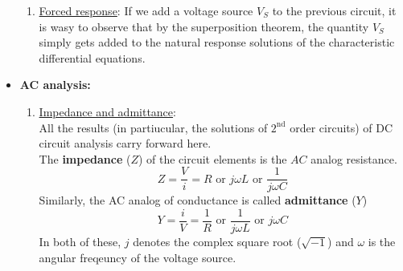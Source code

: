 \documentclass[a4paper]{article}
\begin{document}
\begin{itemize}
\begin{enumerate}
    \item \underline{Forced response}: If we add a voltage source $V_S$ to the previous circuit, it is wasy to observe that by the superposition theorem, the quantity $V_S$ simply gets added to the natural response solutions of the characteristic differential equations.
    \end{enumerate}
    
  \item \textbf{AC analysis:}\\
    \begin{enumerate}
    \item \underline{Impedance and admittance}:\\
      All the results (in partiucular, the solutions of $2^{\text{nd}}$ order circuits) of DC circuit analysis carry forward here.\\
      The \textbf{impedance} ($Z$) of the circuit elements is the $AC$ analog resistance.
      \begin{equation*}
        Z = \frac{V}{i} = R \text{ or } j\omega L  \text{ or } \frac{1}{j\omega C}
      \end{equation*}
      Similarly, the AC analog of conductance is called \textbf{admittance} ($Y$)
      \begin{equation*}
        Y = \frac{i}{V} = \frac{1}{R} \text{ or } \frac{1}{j\omega L} \text{ or }j\omega C
      \end{equation*}
      In both of these, $j$ denotes the complex square root ($\sqrt{-1}$) and $\omega$ is the angular freqeuncy of the voltage source.


\end{enumerate}
\end{itemize}
\end{document}
